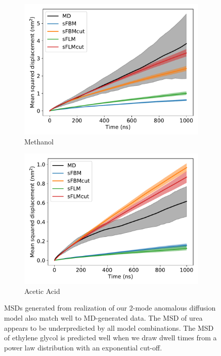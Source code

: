 \documentclass{article}
\begin{document}
\begin{figure}
\begin{subfigure}{0.45\textwidth}
  \includegraphics[width=\textwidth]{2mode_msd_comparison_MET.pdf}
  \caption{Methanol}\label{fig:2mode_msd_comparison_MET}
  \end{subfigure}
  \begin{subfigure}{0.45\textwidth}
  \includegraphics[width=\textwidth]{2mode_msd_comparison_ACH.pdf}
  \caption{Acetic Acid}\label{fig:2mode_msd_comparison_ACH}
  \end{subfigure}
  \caption{MSDs generated from realization of our 2-mode anomalous diffusion model
  also match well to MD-generated data. The MSD of urea appears to be underpredicted
  by all model combinations. The MSD of ethylene glycol is predicted well when 
  we draw dwell times from a power law distribution with an exponential cut-off.}\label{fig:anomalous_msds_2mode}
  \end{figure}
  
\end{document}
